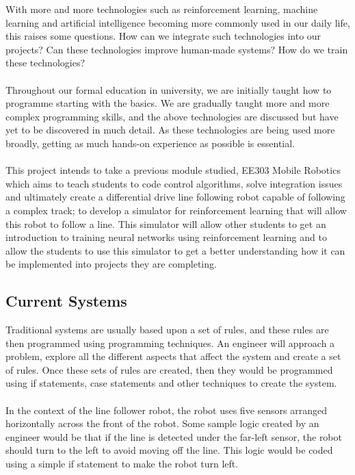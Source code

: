 \documentclass[a4paper,12pt]{article}
\begin{document}
With more and more technologies such as reinforcement learning, machine learning and artificial intelligence becoming more commonly used in our daily life, this raises some questions. How can we integrate such technologies into our projects? Can these technologies improve human-made systems? How do we train these technologies?
\\\\
Throughout our formal education in university, we are initially taught how to programme starting with the basics. We are gradually taught more and more complex programming skills, and the above technologies are discussed but have yet to be discovered in much detail. As these technologies are being used more broadly, getting as much hands-on experience as possible is essential.
\\\\
This project intends to take a previous module studied, EE303 Mobile Robotics which aims to teach students to code control algorithms, solve integration issues and ultimately create a differential drive line following robot capable of following a complex track; to develop a simulator for reinforcement learning that will allow this robot to follow a line. This simulator will allow other students to get an introduction to training neural networks using reinforcement learning and to allow the students to use this simulator to get a better understanding how it can be implemented into projects they are completing.

\subsection{Current Systems}

Traditional systems are usually based upon a set of rules, and these rules are then programmed using programming techniques. An engineer will approach a problem, explore all the different aspects that affect the system and create a set of rules. Once these sets of rules are created, then they would be programmed using if statements, case statements and other techniques to create the system.
\\\\
In the context of the line follower robot, the robot uses five sensors arranged horizontally across the front of the robot. Some sample logic created by an engineer would be that if the line is detected under the far-left sensor, the robot should turn to the left to avoid moving off the line. This logic would be coded using a simple if statement to make the robot turn left.
\end{document}
